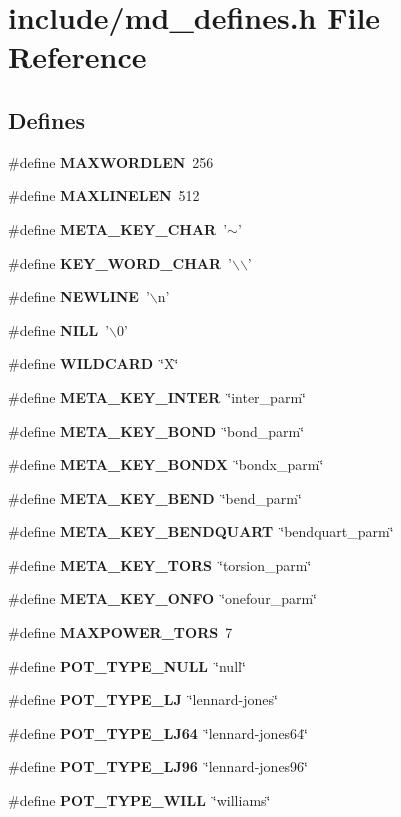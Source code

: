 \section{include/md\_\-defines.h File Reference}
\label{md__defines_8h}
\subsection*{Defines}
\begin{CompactItemize}
\item 
\#define {\bf MAXWORDLEN}~256
\item 
\#define {\bf MAXLINELEN}~512
\item 
\#define {\bf META\_\-KEY\_\-CHAR}~'$\sim$'
\item 
\#define {\bf KEY\_\-WORD\_\-CHAR}~'$\backslash$$\backslash$'
\item 
\#define {\bf NEWLINE}~'$\backslash$n'
\item 
\#define {\bf NILL}~'$\backslash$0'
\item 
\#define {\bf WILDCARD}~\char`\"{}X\char`\"{}
\item 
\#define {\bf META\_\-KEY\_\-INTER}~\char`\"{}inter\_\-parm\char`\"{}
\item 
\#define {\bf META\_\-KEY\_\-BOND}~\char`\"{}bond\_\-parm\char`\"{}
\item 
\#define {\bf META\_\-KEY\_\-BONDX}~\char`\"{}bondx\_\-parm\char`\"{}
\item 
\#define {\bf META\_\-KEY\_\-BEND}~\char`\"{}bend\_\-parm\char`\"{}
\item 
\#define {\bf META\_\-KEY\_\-BENDQUART}~\char`\"{}bendquart\_\-parm\char`\"{}
\item 
\#define {\bf META\_\-KEY\_\-TORS}~\char`\"{}torsion\_\-parm\char`\"{}
\item 
\#define {\bf META\_\-KEY\_\-ONFO}~\char`\"{}onefour\_\-parm\char`\"{}
\item 
\#define {\bf MAXPOWER\_\-TORS}~7
\item 
\#define {\bf POT\_\-TYPE\_\-NULL}~\char`\"{}null\char`\"{}
\item 
\#define {\bf POT\_\-TYPE\_\-LJ}~\char`\"{}lennard-jones\char`\"{}
\item 
\#define {\bf POT\_\-TYPE\_\-LJ64}~\char`\"{}lennard-jones64\char`\"{}
\item 
\#define {\bf POT\_\-TYPE\_\-LJ96}~\char`\"{}lennard-jones96\char`\"{}
\item 
\#define {\bf POT\_\-TYPE\_\-WILL}~\char`\"{}williams\char`\"{}
$$
\end{CompactItemize}
